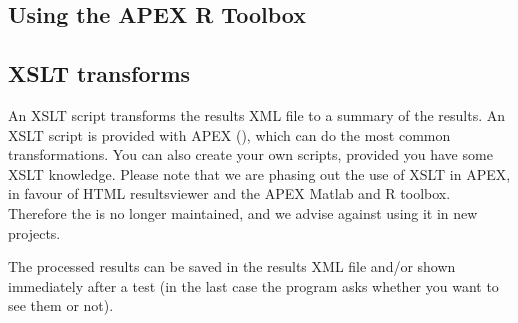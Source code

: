 
\subsection{Using the APEX R Toolbox}

\todo{}

\subsection{XSLT transforms}

An XSLT script transforms the results XML file to a summary of the
results. An XSLT script is provided with APEX (), which can do the most common transformations. You can also create your own scripts, provided you have some XSLT knowledge. Please note that we are phasing out the use of XSLT in APEX, in favour of HTML resultsviewer and the APEX Matlab and R toolbox. Therefore the  is no longer maintained, and we advise against using it in new projects. 

\label{sec:Using XSLT transforms}


The processed results can be saved in the results XML file and/or
shown immediately after a test (in the last case the program asks
whether you want to see them or not).

